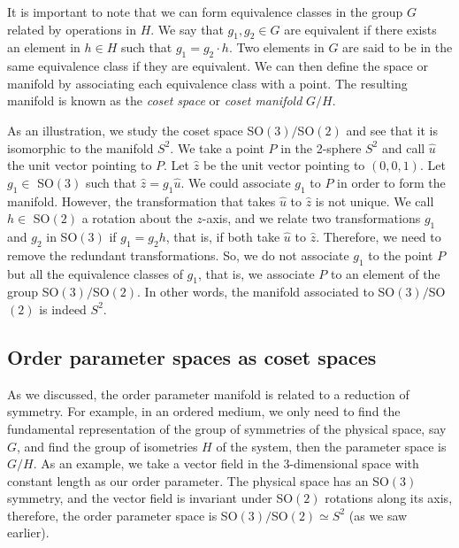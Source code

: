 It is important to note that we can form equivalence classes in the group $G$ related by operations in $H$. We say that $g_1, g_2\in G$ are equivalent if there exists an element in $h\in H$ such that $g_1 = g_2 \cdot h$. Two elements in $G$ are said to be in the same equivalence class if they are equivalent. We can then define the space or manifold by associating each equivalence class with a point. The resulting manifold is known as the \textit{coset space} or \textit{coset manifold} $G/H$.

As an illustration, we study the coset space SO$(3)/$SO$(2)$ and see that it is isomorphic to the manifold $S^2$. We take a point $P$ in the 2-sphere $S^2$ and call $\hat{u}$ the unit vector pointing to $P$. Let $\hat{z}$ be the unit vector pointing to $(0,0,1)$. Let $g_1\in $ SO$(3)$  such that $\hat{z}=g_1\hat{u}$. We could associate $g_1$ to $P$ in order to form the manifold. However, the transformation that takes $\hat{u}$ to $\hat{z}$ is not unique. We call $h\in $ SO$(2)$ a rotation about the $z$-axis, and we relate two transformations $g_1$ and $g_2$ in SO$(3)$ if $g_1 = g_2 h$, that is, if both take $\hat{u}$ to $\hat{z}$. Therefore, we need to remove the redundant transformations. So, we do not associate $g_1$ to the point $P$ but all the equivalence classes of $g_1$, that is, we associate $P$ to an element of the group SO$(3)/$SO$(2)$. In other words, the manifold associated to SO$(3)/$SO$(2)$ is indeed $S^2$.

\subsection{Order parameter spaces as coset spaces}\label{sec:orderparam}
As we discussed, the order parameter manifold is related to a reduction of symmetry.  
For example, in an ordered medium, we only need to find the fundamental representation of the group of symmetries of the physical space, say $G$, and find the group of isometries $H$ of the system, then the parameter space is $G/H$. As an example, we take a vector field in the 3-dimensional space with constant length as our order parameter. The physical space has an SO$(3)$ symmetry, and the vector field is invariant under SO$(2)$ rotations along its axis, therefore, the order parameter space is  SO$(3)/$SO$(2) \simeq S^2$ (as we saw earlier). 

